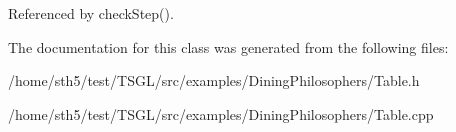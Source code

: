 Referenced by check\+Step().



The documentation for this class was generated from the following files\+:\begin{DoxyCompactItemize}
\item 
/home/sth5/test/\+T\+S\+G\+L/src/examples/\+Dining\+Philosophers/Table.\+h\item 
/home/sth5/test/\+T\+S\+G\+L/src/examples/\+Dining\+Philosophers/Table.\+cpp\end{DoxyCompactItemize}
